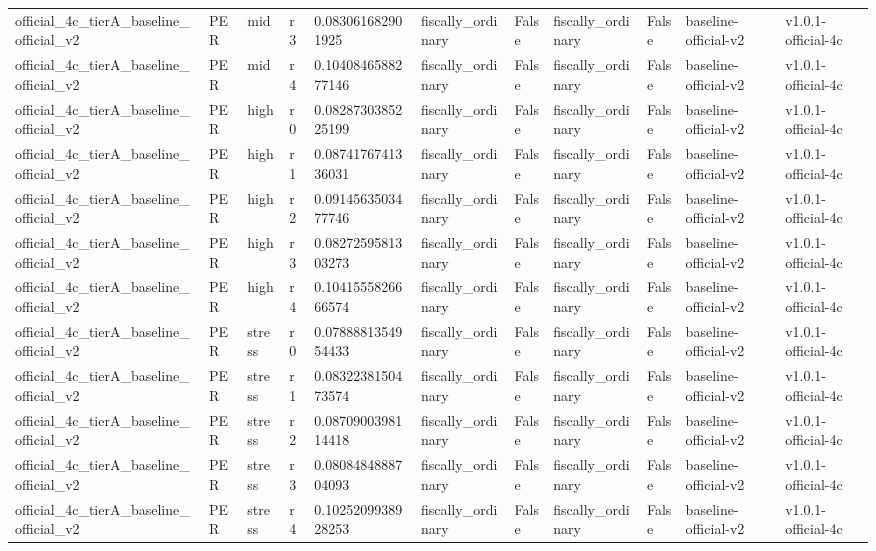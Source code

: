 \begin{landscape}
\begin{longtable}{lllllllllll}
official\_4c\_tierA\_baseline\_official\_v2 & PER & mid & r3 & 0.083061682901925 & fiscally\_ordinary & False & fiscally\_ordinary & False & baseline-official-v2 & v1.0.1-official-4c \\
official\_4c\_tierA\_baseline\_official\_v2 & PER & mid & r4 & 0.1040846588277146 & fiscally\_ordinary & False & fiscally\_ordinary & False & baseline-official-v2 & v1.0.1-official-4c \\
official\_4c\_tierA\_baseline\_official\_v2 & PER & high & r0 & 0.0828730385225199 & fiscally\_ordinary & False & fiscally\_ordinary & False & baseline-official-v2 & v1.0.1-official-4c \\
official\_4c\_tierA\_baseline\_official\_v2 & PER & high & r1 & 0.0874176741336031 & fiscally\_ordinary & False & fiscally\_ordinary & False & baseline-official-v2 & v1.0.1-official-4c \\
official\_4c\_tierA\_baseline\_official\_v2 & PER & high & r2 & 0.0914563503477746 & fiscally\_ordinary & False & fiscally\_ordinary & False & baseline-official-v2 & v1.0.1-official-4c \\
official\_4c\_tierA\_baseline\_official\_v2 & PER & high & r3 & 0.0827259581303273 & fiscally\_ordinary & False & fiscally\_ordinary & False & baseline-official-v2 & v1.0.1-official-4c \\
official\_4c\_tierA\_baseline\_official\_v2 & PER & high & r4 & 0.1041555826666574 & fiscally\_ordinary & False & fiscally\_ordinary & False & baseline-official-v2 & v1.0.1-official-4c \\
official\_4c\_tierA\_baseline\_official\_v2 & PER & stress & r0 & 0.0788881354954433 & fiscally\_ordinary & False & fiscally\_ordinary & False & baseline-official-v2 & v1.0.1-official-4c \\
official\_4c\_tierA\_baseline\_official\_v2 & PER & stress & r1 & 0.0832238150473574 & fiscally\_ordinary & False & fiscally\_ordinary & False & baseline-official-v2 & v1.0.1-official-4c \\
official\_4c\_tierA\_baseline\_official\_v2 & PER & stress & r2 & 0.0870900398114418 & fiscally\_ordinary & False & fiscally\_ordinary & False & baseline-official-v2 & v1.0.1-official-4c \\
official\_4c\_tierA\_baseline\_official\_v2 & PER & stress & r3 & 0.0808484888704093 & fiscally\_ordinary & False & fiscally\_ordinary & False & baseline-official-v2 & v1.0.1-official-4c \\
official\_4c\_tierA\_baseline\_official\_v2 & PER & stress & r4 & 0.1025209938928253 & fiscally\_ordinary & False & fiscally\_ordinary & False & baseline-official-v2 & v1.0.1-official-4c \\

\end{longtable}
\end{landscape}

